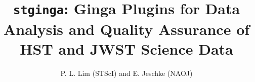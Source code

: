 \documentclass[]{article}
\def\mypaperwidth{27.83in} \def\mypaperheight{39.37in}     %
\def\mydblmargin{\dimen87}
\begin{document}
\setlength{\textwidth}{\mypaperwidth-\mydblmargin}
\setlength{\textheight}{\mypaperheight-\mydblmargin}

\setlength{\hoffset}{-1.0in}
\setlength{\voffset}{-1.0in}

\setlength{\marginparwidth}{0in}
\setlength{\marginparsep}{0in}

\setlength{\footskip}{1em}

\setlength\headheight{0in}
\setlength\headsep{1em}

\setlength{\topmargin}{0.0in}
\setlength{\oddsidemargin}{1in}
\setlength{\evensidemargin}{1in}

\newcommand{\para}{\vspace*{1em}}

\title{{\tt stginga}: Ginga Plugins for Data Analysis and Quality Assurance of
            HST and JWST Science Data}
\author{P. L. Lim (STScI) and E. Jeschke (NAOJ)}

\setlength{\parindent}{0in}
\setlength{\parskip}{0pt}

\raggedright


\pagestyle{empty}
\end{document}
